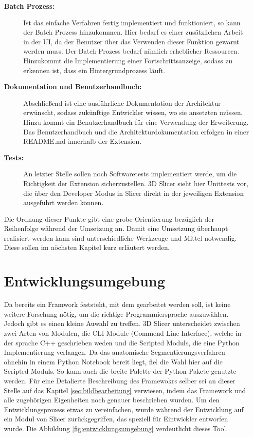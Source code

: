 \begin{description}
	\item[\textbf{Batch Prozess:}] Ist das einfache Verfahren fertig implementiert
		und funktioniert, so kann der Batch Prozess hinzukommen. Hier bedarf es einer
		zusätzlichen Arbeit in der UI, da der Benutzer über das Verwenden dieser
		Funktion gewarnt werden muss. Der Batch Prozess bedarf nämlich erheblicher Ressourcen.
		Hinzukommt die Implementierung einer Fortschrittsanzeige, sodass zu erkennen
		ist, dass ein Hintergrundprozess läuft.

	\item[\textbf{Dokumentation und Benutzerhandbuch:}] Abschließend ist eine ausführliche
		Dokumentation der Architektur erwünscht, sodass zukünftige Entwickler wissen,
		wo sie ansetzten müssen. Hinzu kommt ein Benutzerhandbuch für eine
		Verwendung der Erweiterung. Das Benutzerhandbuch und die Architekturdokumentation
		erfolgen in einer README.md innerhalb der Extension.

	\item[\textbf{Tests:}] An letzter Stelle sollen noch Softwaretests implementiert
		werde, um die Richtigkeit der Extension sicherzustellen. 3D Slicer sieht hier
		Unittests vor, die über den Developer Modus in Slicer direkt in der
		jeweiligen Extension ausgeführt werden können.
\end{description}

Die Ordnung dieser Punkte gibt eine grobe Orientierung bezüglich der Reihenfolge
während der Umsetzung an. Damit eine Umsetzung überhaupt realisiert werden kann
sind unterschiedliche Werkzeuge und Mittel notwendig. Diese sollen im nöchsten Kapitel
kurz erläutert werden.

\section{Entwicklungsumgebung}
Da bereits ein Framwork feststeht, mit dem gearbeitet werden soll, ist keine weitere
Forschung nötig, um die richtige Programmiersprache auszuwählen. Jedoch gibt es einen
kleine Auwahl zu treffen. 3D Slicer unterscheidet zwischen zwei Arten von
Modulen, die CLI-Module (Commend Line Interface), welche in der sprache C++
geschrieben weden und die Scripted Moduls, die eine Python Implementierung verlangen.
Da das anatomische Segmentierungsverfahren ohnehin in einem Python Notebook
bereit liegt, fiel die Wahl hier auf die Scripted Moduls. So kann auch die
breite Palette der Python Pakete genutzte werden. Für eine Detalierte Beschreibung
des Framewokrs selber sei an dieser Stelle auf das Kapitel \ref{sec:bildbearbeitung}
verwiesen, indem das Framework und alle zugehörigen Eigenheiten noch genauer
beschrieben wurden. Um den Entwicklungsprozess etwas zu vereinfachen, wurde
während der Entwicklung auf ein Modul von Slicer zurückgegriffen, das speziell für
Eintwickler entworfen wurde. Die Abbildung \ref{fig:entwicklungsumgebung}
verdeutlicht dieses Tool.

